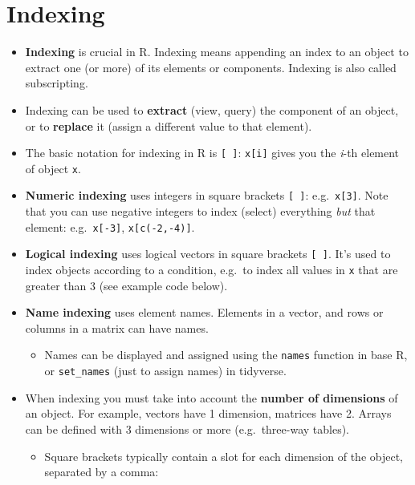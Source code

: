 \documentclass[
]{book}
\providecommand{\tightlist}{%
  \setlength{\itemsep}{0pt}\setlength{\parskip}{0pt}}
\begin{document}
\hypertarget{indexing}{%
\section{Indexing}\label{indexing}}

\begin{itemize}
\tightlist
\item
  \textbf{Indexing} is crucial in R. Indexing means appending an index to an object to extract one (or more) of its elements or components. Indexing is also called subscripting.
\item
  Indexing can be used to \textbf{extract} (view, query) the component of an object, or to \textbf{replace} it (assign a different value to that element).
\item
  The basic notation for indexing in R is \texttt{{[}\ {]}}: \texttt{x{[}i{]}} gives you the \emph{i}-th element of object \texttt{x}.
\item
  \textbf{Numeric indexing} uses integers in square brackets \texttt{{[}\ {]}}: e.g.~\texttt{x{[}3{]}}. Note that you can use negative integers to index (select) everything \emph{but} that element: e.g.~\texttt{x{[}-3{]}}, \texttt{x{[}c(-2,-4){]}}.
\item
  \textbf{Logical indexing} uses logical vectors in square brackets \texttt{{[}\ {]}}. It's used to index objects according to a condition, e.g.~to index all values in \texttt{x} that are greater than 3 (see example code below).
\item
  \textbf{Name indexing} uses element names. Elements in a vector, and rows or columns in a matrix can have names.

  \begin{itemize}
  \tightlist
  \item
    Names can be displayed and assigned using the \texttt{names} function in base R, or \texttt{set\_names} (just to assign names) in tidyverse.
  \end{itemize}
\item
  When indexing you must take into account the \textbf{number of dimensions} of an object. For example, vectors have 1 dimension, matrices have 2. Arrays can be defined with 3 dimensions or more (e.g.~three-way tables).

  \begin{itemize}
  \tightlist
  \item
    Square brackets typically contain a slot for each dimension of the object, separated by a comma:


\end{itemize}
\end{itemize}
\end{document}
